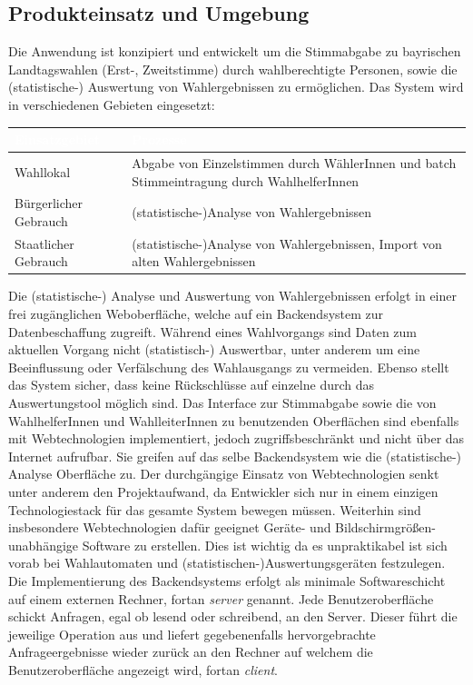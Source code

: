 \documentclass[a4paper,12pt]{article}
\begin{document}
\subsection{Produkteinsatz und Umgebung}
Die Anwendung ist konzipiert und entwickelt um die Stimmabgabe 
zu bayrischen Landtagswahlen (Erst-, Zweitstimme) durch wahlberechtigte
Personen, sowie die (statistische-) Auswertung von Wahlergebnissen zu ermöglichen. 
%
Das System wird in verschiedenen Gebieten eingesetzt:

\begin{center}
\begin{tabular}{|m{5cm}|m{10cm}|}
	\hline
  \rowcolor{TUMBlue} \textcolor{white}{\textbf{Einsatzgebiet}} & \textcolor{white}{\textbf{Prozesse}} \\
  \hline
  Wahllokal & Abgabe von Einzelstimmen durch WählerInnen und batch Stimmeintragung durch WahlhelferInnen \\
	\hline
  Bürgerlicher Gebrauch & (statistische-)Analyse von Wahlergebnissen \\
  \hline
  Staatlicher Gebrauch & (statistische-)Analyse von Wahlergebnissen, Import von alten Wahlergebnissen \\
	\hline
\end{tabular}
\end{center}

Die (statistische-) Analyse und Auswertung von Wahlergebnissen erfolgt in einer frei zugänglichen
Weboberfläche, welche auf ein Backendsystem zur Datenbeschaffung zugreift. 
Während eines Wahlvorgangs sind Daten zum aktuellen Vorgang nicht (statistisch-) Auswertbar,
unter anderem um eine Beeinflussung oder Verfälschung des Wahlausgangs zu vermeiden.
Ebenso stellt das System sicher, dass keine Rückschlüsse auf einzelne durch das Auswertungstool
möglich sind.
%
Das Interface zur Stimmabgabe sowie die von WahlhelferInnen und WahlleiterInnen zu benutzenden Oberflächen sind 
ebenfalls mit Webtechnologien implementiert, jedoch zugriffsbeschränkt und nicht über das Internet aufrufbar. Sie greifen
auf das selbe Backendsystem wie die (statistische-) Analyse Oberfläche zu.
%
Der durchgängige Einsatz von Webtechnologien senkt unter anderem den Projektaufwand, da Entwickler sich nur in 
einem einzigen Technologiestack für das gesamte System bewegen müssen. Weiterhin sind insbesondere 
Webtechnologien dafür geeignet Geräte- und Bildschirmgrößen-unabhängige Software zu erstellen. Dies ist wichtig
da es unpraktikabel ist sich vorab bei Wahlautomaten und (statistischen-)Auswertungsgeräten festzulegen.
%
Die Implementierung des Backendsystems erfolgt als minimale Softwareschicht auf einem externen 
Rechner, fortan \textit{server} genannt. Jede Benutzeroberfläche schickt Anfragen, egal ob lesend oder schreibend, 
an den Server. Dieser führt die jeweilige Operation aus und liefert gegebenenfalls hervorgebrachte
Anfrageergebnisse wieder zurück an den Rechner auf welchem die Benutzeroberfläche angezeigt wird, fortan \textit{client}.
\end{document}
